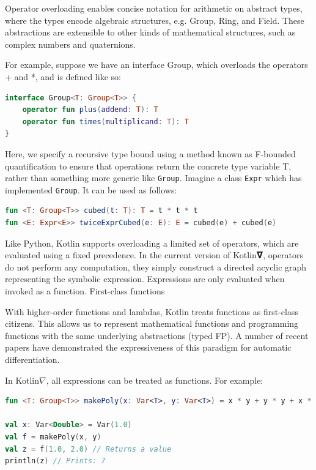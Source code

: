\documentclass[12pt,initial,twoside,maitrise]{dms}
\numberwithin{equation}{section}
\numberwithin{table}{chapter}
\numberwithin{figure}{chapter}
\begin{document}
Operator overloading enables concise notation for arithmetic on abstract types, where the types encode algebraic structures, e.g. Group, Ring, and Field. These abstractions are extensible to other kinds of mathematical structures, such as complex numbers and quaternions.

For example, suppose we have an interface Group, which overloads the operators + and *, and is defined like so:

\begin{lstlisting}[caption={Simple code listing.}, language=Kotlin]
interface Group<T: Group<T>> {
    operator fun plus(addend: T): T
    operator fun times(multiplicand: T): T
}
\end{lstlisting}

Here, we specify a recursive type bound using a method known as F-bounded quantification to ensure that operations return the concrete type variable T, rather than something more generic like \texttt{Group}. Imagine a class \texttt{Expr} which has implemented \texttt{Group}. It can be used as follows:

\begin{lstlisting}[caption={Simple code listing.}, language=Kotlin]
fun <T: Group<T>> cubed(t: T): T = t * t * t
fun <E: Expr<E>> twiceExprCubed(e: E): E = cubed(e) + cubed(e)
\end{lstlisting}

Like Python, Kotlin supports overloading a limited set of operators, which are evaluated using a fixed precedence. In the current version of Kotlin𝛁, operators do not perform any computation, they simply construct a directed acyclic graph representing the symbolic expression. Expressions are only evaluated when invoked as a function.
First-class functions

With higher-order functions and lambdas, Kotlin treats functions as first-class citizens. This allows us to represent mathematical functions and programming functions with the same underlying abstractions (typed FP). A number of recent papers have demonstrated the expressiveness of this paradigm for automatic differentiation.

In Kotlin$\nabla$, all expressions can be treated as functions. For example:

\begin{lstlisting}[caption={Simple code listing.}, language=Kotlin]
fun <T: Group<T>> makePoly(x: Var<T>, y: Var<T>) = x * y + y * y + x * x

val x: Var<Double> = Var(1.0)
val f = makePoly(x, y)
val z = f(1.0, 2.0) // Returns a value
println(z) // Prints: 7
\end{lstlisting}
\end{document}
